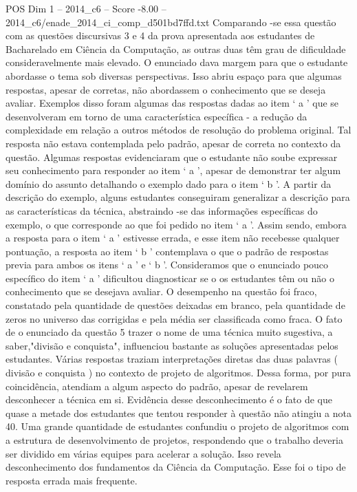 \begin{textsample}{POS Dim 1 – 2014\_c6 – Score -8.00 – 2014\_c6/enade\_2014\_ci\_comp\_d501bd7ffd.txt}
Comparando -se essa questão com as questões discursivas 3 e 4 da prova apresentada aos estudantes de Bacharelado em Ciência da Computação, as outras duas têm grau de dificuldade consideravelmente mais elevado.
O enunciado dava margem para que o estudante abordasse o tema sob diversas perspectivas.
Isso abriu espaço para que algumas respostas, apesar de corretas, não abordassem o conhecimento que se deseja avaliar.
Exemplos disso foram algumas das respostas dadas ao item ‘ a ’ que se desenvolveram em torno de uma característica específica - a redução da complexidade em relação a outros métodos de resolução do problema original.
Tal resposta não estava contemplada pelo padrão, apesar de correta no contexto da questão.
Algumas respostas evidenciaram que o estudante não soube expressar seu conhecimento para responder ao item ‘ a ’, apesar de demonstrar ter algum domínio do assunto detalhando o exemplo dado para o item ‘ b ’.
A partir da descrição do exemplo, alguns estudantes conseguiram generalizar a descrição para as características da técnica, abstraindo -se das informações específicas do exemplo, o que corresponde ao que foi pedido no item ‘ a ’.
Assim sendo, embora a resposta para o item ‘ a ’ estivesse errada, e esse item não recebesse qualquer pontuação, a resposta ao item ‘ b ’ contemplava o que o padrão de respostas previa para ambos os itens ‘ a ’ e ‘ b ’.
Consideramos que o enunciado pouco específico do item ‘ a ’ dificultou diagnosticar se o os estudantes têm ou não o conhecimento que se desejava avaliar.
O desempenho na questão foi fraco, constatado pela quantidade de questões deixadas em branco, pela quantidade de zeros no universo das corrigidas e pela média ser classificada como fraca.
O fato de o enunciado da questão 5 trazer o nome de uma técnica muito sugestiva, a saber,"divisão e conquista", influenciou bastante as soluções apresentadas pelos estudantes.
Várias respostas traziam interpretações diretas das duas palavras ( divisão e conquista ) no contexto de projeto de algoritmos.
Dessa forma, por pura coincidência, atendiam a algum aspecto do padrão, apesar de revelarem desconhecer a técnica em si.
Evidência desse desconhecimento é o fato de que quase a metade dos estudantes que tentou responder à questão não atingiu a nota 40.
Uma grande quantidade de estudantes confundiu o projeto de algoritmos com a estrutura de desenvolvimento de projetos, respondendo que o trabalho deveria ser dividido em várias equipes para acelerar a solução.
Isso revela desconhecimento dos fundamentos da Ciência da Computação.
Esse foi o tipo de resposta errada mais frequente.

\end{textsample}
